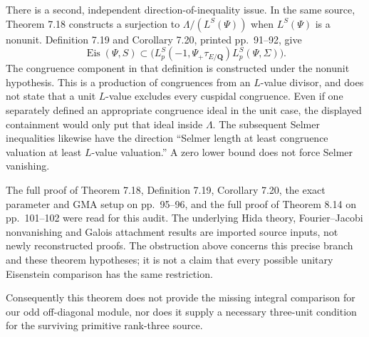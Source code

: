 There is a second, independent direction-of-inequality issue.
In the same source, Theorem 7.18 constructs a surjection to
$\Lambda/(L^S(\Psi))$ when $L^S(\Psi)$ is a nonunit.
Definition 7.19 and Corollary 7.20, printed pp.~91--92, give
\[
 \operatorname{Eis}(\Psi,S)
 \subset
 \bigl(L_p^S(-1,\Psi_+\tau_{E/\mathbf Q})
                         L_p^S(\Psi,\Sigma)\bigr).
 \tag{HU.3}
\]
The congruence component in that definition is constructed
under the nonunit hypothesis.  This is a production of
congruences from an $L$-value divisor, and does not state
that a unit $L$-value excludes every cuspidal congruence.
Even if one separately defined an appropriate congruence
ideal in the unit case, the displayed containment would
only put that ideal inside $\Lambda$.
The subsequent Selmer inequalities likewise have the
direction ``Selmer length at least congruence valuation
at least $L$-value valuation.''  A zero lower bound
does not force Selmer vanishing.

The full proof of Theorem 7.18, Definition 7.19,
Corollary 7.20, the exact parameter and GMA setup on
pp.~95--96, and the full proof of Theorem 8.14 on
pp.~101--102 were read for this audit.  The underlying
Hida theory, Fourier--Jacobi nonvanishing and Galois
attachment results are imported source inputs, not
newly reconstructed proofs.  The obstruction above
concerns this precise branch and these theorem hypotheses;
it is not a claim that every possible unitary Eisenstein
comparison has the same restriction.

Consequently this theorem does not provide the missing
integral comparison for our odd off-diagonal module,
nor does it supply a necessary three-unit condition for
the surviving primitive rank-three source.

